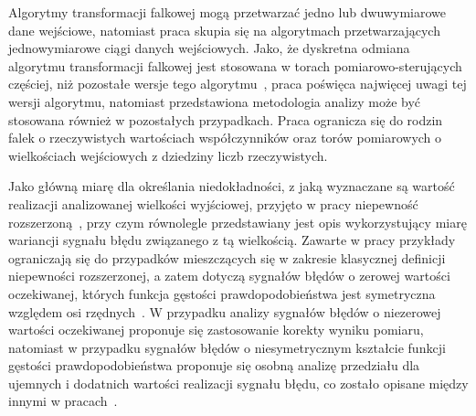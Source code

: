 Algorytmy transformacji falkowej mogą przetwarzać jedno lub dwuwymiarowe dane wejściowe, natomiast praca skupia się na algorytmach przetwarzających jednowymiarowe ciągi danych wejściowych. Jako, że dyskretna odmiana algorytmu transformacji falkowej jest stosowana w torach pomiarowo-sterujących częściej, niż pozostałe wersje tego algorytmu~\cite{wallen_handbook, lord_guide, akujuobi_applications}, praca poświęca najwięcej uwagi tej wersji algorytmu, natomiast przedstawiona metodologia analizy może być stosowana również w pozostałych przypadkach. Praca ogranicza się do rodzin falek o rzeczywistych wartościach współczynników oraz torów pomiarowych o wielkościach wejściowych z dziedziny liczb rzeczywistych.

Jako główną miarę dla określania niedokładności, z jaką wyznaczane są wartość realizacji analizowanej wielkości wyjściowej, przyjęto w pracy niepewność rozszerzoną~\cite{jcgm_guide}, przy czym równolegle przedstawiany jest opis wykorzystujący miarę wariancji sygnału błędu związanego z tą wielkością. Zawarte w pracy przykłady ograniczają się do przypadków mieszczących się w zakresie klasycznej definicji niepewności rozszerzonej, a zatem dotyczą sygnałów błędów o zerowej wartości oczekiwanej, których funkcja gęstości prawdopodobieństwa jest symetryczna względem osi rzędnych~\cite{jcgm_guide}. W przypadku analizy sygnałów błędów o niezerowej wartości oczekiwanej proponuje się zastosowanie korekty wyniku pomiaru, natomiast w przypadku sygnałów błędów o niesymetrycznym kształcie funkcji gęstości prawdopodobieństwa proponuje się osobną analizę przedziału dla ujemnych i dodatnich wartości realizacji sygnału błędu, co zostało opisane między innymi w pracach~\cite{roj_annuncertainty, wymyslo_range, jakubiec_system}.
